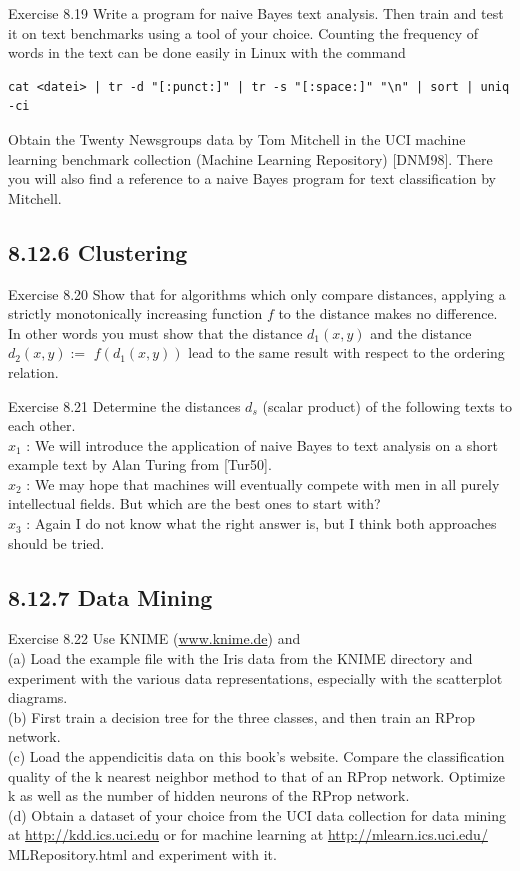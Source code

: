 \documentclass[10pt]{article}
\begin{document}
Exercise 8.19 Write a program for naive Bayes text analysis. Then train and test it on text benchmarks using a tool of your choice. Counting the frequency of words in the text can be done easily in Linux with the command

\begin{verbatim}
cat <datei> | tr -d "[:punct:]" | tr -s "[:space:]" "\n" | sort | uniq -ci
\end{verbatim}

Obtain the Twenty Newsgroups data by Tom Mitchell in the UCI machine learning benchmark collection (Machine Learning Repository) [DNM98]. There you will also find a reference to a naive Bayes program for text classification by Mitchell.

\subsection*{8.12.6 Clustering}
Exercise 8.20 Show that for algorithms which only compare distances, applying a strictly monotonically increasing function $f$ to the distance makes no difference. In other words you must show that the distance $d_{1}(x, y)$ and the distance $d_{2}(x, y):=$ $f\left(d_{1}(x, y)\right)$ lead to the same result with respect to the ordering relation.

Exercise 8.21 Determine the distances $d_{s}$ (scalar product) of the following texts to each other.\\

$x_{1}$ : We will introduce the application of naive Bayes to text analysis on a short example text by Alan Turing from [Tur50].\\
$x_{2}$ : We may hope that machines will eventually compete with men in all purely intellectual fields. But which are the best ones to start with?\\
$x_{3}$ : Again I do not know what the right answer is, but I think both approaches should be tried.

\subsection*{8.12.7 Data Mining}
Exercise 8.22 Use KNIME (\href{http://www.knime.de}{www.knime.de}) and\\
(a) Load the example file with the Iris data from the KNIME directory and experiment with the various data representations, especially with the scatterplot diagrams.\\
(b) First train a decision tree for the three classes, and then train an RProp network.\\
(c) Load the appendicitis data on this book's website. Compare the classification quality of the k nearest neighbor method to that of an RProp network. Optimize k as well as the number of hidden neurons of the RProp network.\\
(d) Obtain a dataset of your choice from the UCI data collection for data mining at \href{http://kdd.ics.uci.edu}{http://kdd.ics.uci.edu} or for machine learning at \href{http://mlearn.ics.uci.edu/}{http://mlearn.ics.uci.edu/} MLRepository.html and experiment with it.
\end{document}
